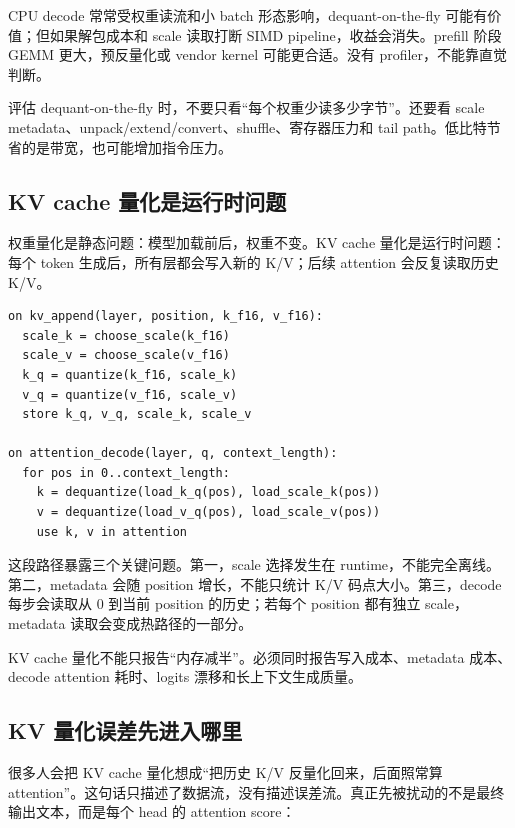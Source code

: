 CPU decode 常常受权重读流和小 batch 形态影响，dequant-on-the-fly 可能有价值；但如果解包成本和 scale 读取打断 SIMD pipeline，收益会消失。prefill 阶段 GEMM 更大，预反量化或 vendor kernel 可能更合适。没有 profiler，不能靠直觉判断。

评估 dequant-on-the-fly 时，不要只看“每个权重少读多少字节”。还要看 scale metadata、unpack/extend/convert、shuffle、寄存器压力和 tail path。低比特节省的是带宽，也可能增加指令压力。

\subsection{KV cache 量化是运行时问题}

权重量化是静态问题：模型加载前后，权重不变。KV cache 量化是运行时问题：每个 token 生成后，所有层都会写入新的 K/V；后续 attention 会反复读取历史 K/V。

\begin{lstlisting}[numbers=none,caption={KV cache 量化写入和读取路径}]
on kv_append(layer, position, k_f16, v_f16):
  scale_k = choose_scale(k_f16)
  scale_v = choose_scale(v_f16)
  k_q = quantize(k_f16, scale_k)
  v_q = quantize(v_f16, scale_v)
  store k_q, v_q, scale_k, scale_v

on attention_decode(layer, q, context_length):
  for pos in 0..context_length:
    k = dequantize(load_k_q(pos), load_scale_k(pos))
    v = dequantize(load_v_q(pos), load_scale_v(pos))
    use k, v in attention
\end{lstlisting}

这段路径暴露三个关键问题。第一，scale 选择发生在 runtime，不能完全离线。第二，metadata 会随 position 增长，不能只统计 K/V 码点大小。第三，decode 每步会读取从 0 到当前 position 的历史；若每个 position 都有独立 scale，metadata 读取会变成热路径的一部分。

\begin{warningbox}
KV cache 量化不能只报告“内存减半”。必须同时报告写入成本、metadata 成本、decode attention 耗时、logits 漂移和长上下文生成质量。
\end{warningbox}

\subsection{KV 量化误差先进入哪里}

很多人会把 KV cache 量化想成“把历史 K/V 反量化回来，后面照常算 attention”。这句话只描述了数据流，没有描述误差流。真正先被扰动的不是最终输出文本，而是每个 head 的 attention score：


